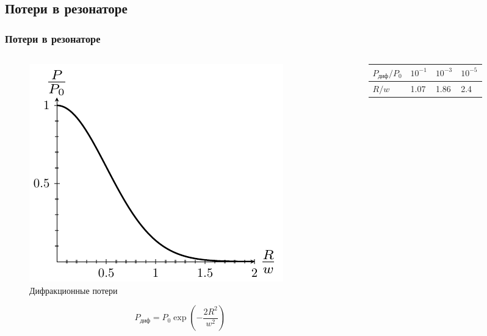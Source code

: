 \subsection{Потери в резонаторе}
\begin{frame}[c]%
	\frametitle{Потери в резонаторе}
	\vspace{-1em}
	\begin{columns}[t]
		\begin{column}{0.44\textwidth}%
			\vspace{-2em}
			\begin{figure}[h]
				\includegraphics[width=1\linewidth]{ris/p}
				\caption{Дифракционные потери}
				\vspace{-0.8em}
			\end{figure}
		\begin{equation*}
			P_\text{диф}=P_0\exp\left(-\frac{2R^2}{w^2}\right)
		\end{equation*}	
		\end{column}
		\begin{column}{0.55\textwidth}%

\begin{tabu} to \textwidth { | X[1.5,c] | X[c] | X[c] | X[c] |}
 \hline
 $P_\text{диф}/P_0$ & $10^{-1}$ & $10^{-3}$ & $10^{-5}$ \\
 \hline
 $R/w$  & 1.07 & 1.86 & 2.4 \\
\hline
\end{tabu}


\end{column}
\end{columns}
\end{frame}
